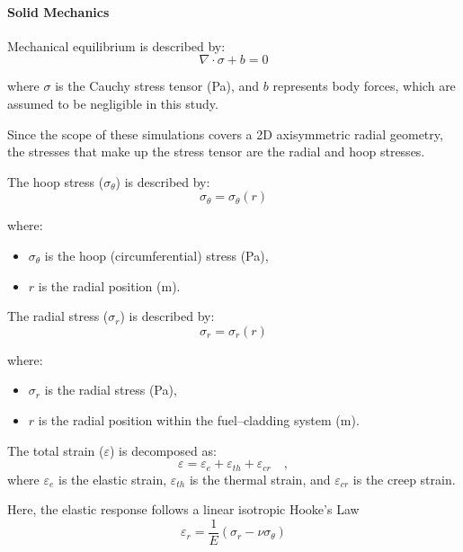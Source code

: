 \paragraph{Solid Mechanics}
Mechanical equilibrium is described by:
\begin{equation}
    \nabla\cdot \sigma + b =0
\end{equation}

where $\sigma$ is the Cauchy stress tensor (Pa), and $b$ represents body forces, which are assumed to be negligible in this study.

Since the scope of these simulations covers a 2D axisymmetric radial geometry, the stresses that make up the stress tensor are the radial and hoop stresses.

The hoop stress ($\sigma_\theta$) is described by:
\begin{equation}
    \sigma_\theta = \sigma_\theta(r)
\end{equation}

where:
\begin{itemize}
	\item $\sigma_\theta$ is the hoop (circumferential) stress (Pa),
	\item $r$ is the radial position (m).
\end{itemize}

The radial stress ($\sigma_r$) is described by:
\begin{equation}
    \sigma_r = \sigma_r(r)
\end{equation}

where:
\begin{itemize}
	\item $\sigma_r$ is the radial stress (Pa),
	\item $r$ is the radial position within the fuel--cladding system (m).
\end{itemize}

The total strain ($\varepsilon$) is decomposed as:
\begin{equation}
    \varepsilon = \varepsilon_e + \varepsilon_{th} + \varepsilon_{cr}\quad ,
\end{equation}
where $\varepsilon_e$ is the elastic strain, $\varepsilon_{th}$ is the thermal strain, and $\varepsilon_{cr}$ is the creep strain.

Here, the elastic response follows a linear isotropic Hooke's Law
\begin{equation}
    \varepsilon_r = \frac{1}{E} \left( \sigma_r - \nu \sigma_\theta \right)
\end{equation}

